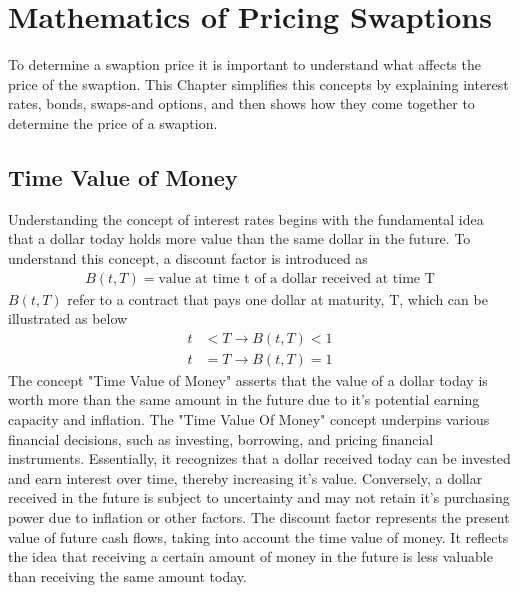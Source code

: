 \section{Mathematics of Pricing Swaptions}
To determine a swaption price it is important to understand what affects the price of the swaption. 
This Chapter simplifies this concepts by explaining interest rates, bonds, swaps-and options, 
and then shows how they come together to determine the price of a swaption.
\subsection{Time Value of Money}
Understanding the concept of interest rates begins with the fundamental idea that a dollar today holds 
more value than the same dollar in the future. To understand this concept, a discount factor is introduced as 
\begin{align*}
    B(t,T) = \text{value at time t of a dollar received at time T}
\end{align*} 
$B(t,T)$ refer to a contract that pays one dollar at maturity, T, which can be illustrated as below
\begin{align*}
    t & < T \rightarrow B(t,T) < 1 \\
    t & = T \rightarrow B(t,T) = 1
\end{align*}
The concept "Time Value of Money" asserts that the value of a dollar today is worth more than
the same amount in the future due to it's potential earning capacity and inflation.
The "Time Value Of Money" concept underpins various financial decisions, such as investing, borrowing,
and pricing financial instruments. Essentially, it recognizes that a dollar received today can be invested 
and earn interest over time, thereby increasing it's value. Conversely, a dollar received in the future
is subject to uncertainty and may not retain it's purchasing power due to inflation or other factors.
The discount factor represents the present value of future cash flows, taking into account the time value of money.
It reflects the idea that receiving a certain amount of money in the future is less valuable than receiving 
the same amount today.
